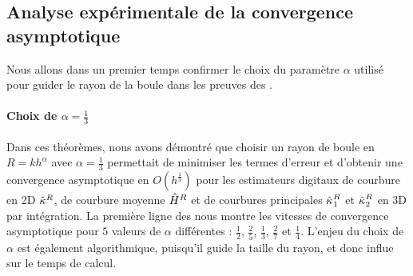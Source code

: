 \subsection{Analyse expérimentale de la convergence asymptotique}
%
Nous allons dans un premier temps confirmer le choix du paramètre $\alpha$
utilisé pour guider le rayon de la boule dans les preuves des
.
%
\paragraph{Choix de $\alpha = \frac{1}{3}$}
%
Dans ces théorèmes, nous avons démontré que choisir un rayon de boule en $R =
kh^\alpha$ avec $\alpha = \frac{1}{3}$ permettait de minimiser les termes
d'erreur et d'obtenir une convergence asymptotique en $O(h^\frac{1}{3})$ pour
les estimateurs digitaux de courbure en 2D $\hat{\kappa}^{R}$, de courbure moyenne
$\hat{H}^{R}$ et de courbures principales $\hat{\kappa_{}}_{1}^{R}$ et
$\hat{\kappa_{}}_{2}^{R}$ en 3D par intégration. La première ligne des
nous montre les vitesses de convergence asymptotique pour $5$ valeurs de
$\alpha$ différentes : $\frac{1}{2}$, $\frac{2}{5}$, $\frac{1}{3}$,
$\frac{2}{7}$ et $\frac{1}{4}$. L'enjeu du choix de $\alpha$ est également
algorithmique, puisqu'il guide la taille du rayon, et donc influe sur le temps
de calcul.


